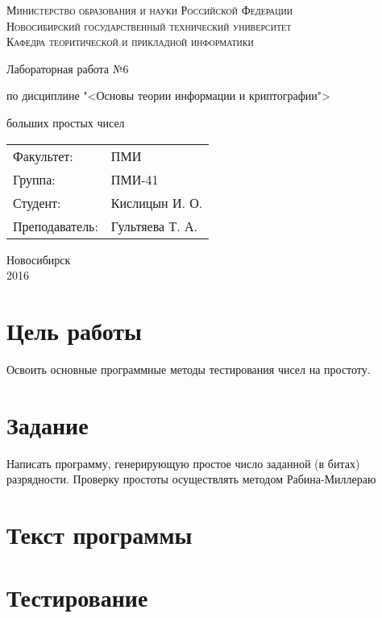 \documentclass[oneside, final, 12pt]{extarticle}
\begin{document}
\begin{titlepage}
	\begin{centering}
		\textsc{Министерство образования и науки Российской Федерации}\\
		\textsc{Новосибирский государственный технический университет}\\
		\textsc{Кафедра теоритической и прикладной информатики}\\
	\end{centering}
	\vfill
	\vfill
	\vfill
	\Large
	\centerline{Лабораторная работа №6}
	\centerline{по дисциплине "<Основы теории информации и криптографии">}
	\centerline{ больших простых чисел}
	\normalsize
	\vfill
	\vfill
	\vfill
	\begin{flushleft}
		\begin{minipage}{0.3\textwidth}
			\begin{tabular}{l l}
				Факультет: & ПМИ\\
				Группа: & ПМИ-41\\
				Студент: & Кислицын И. О.\\
				Преподаватель: & Гультяева Т. А. 
			\end{tabular}
		\end{minipage}
	\end{flushleft}
	\vfill
	\vfill
	\begin{centering}
		Новосибирск\\
		2016\\
	\end{centering}
\end{titlepage}
\setcounter{page}{2}
\lstset{
	breaklines=\true,
	basicstyle=\footnotesize\ttfamily,
	tabsize=2,
	showspaces=\false,
	breaklines=\true,
	breakatwhitespace=\true,
	extendedchars=\true,
	keepspaces=\true,
	language=Haskell
}
\section{Цель работы}
Освоить основные программные методы тестирования чисел на простоту.

\section{Задание}
Написать программу, генерирующую простое число заданной (в битах) разрядности. Проверку простоты осуществлять методом Рабина-Миллераю

\section{Текст программы}

\lstset{caption=Logic.hs}


\section{Тестирование}

\lstset{caption=stdout}

\end{document}
